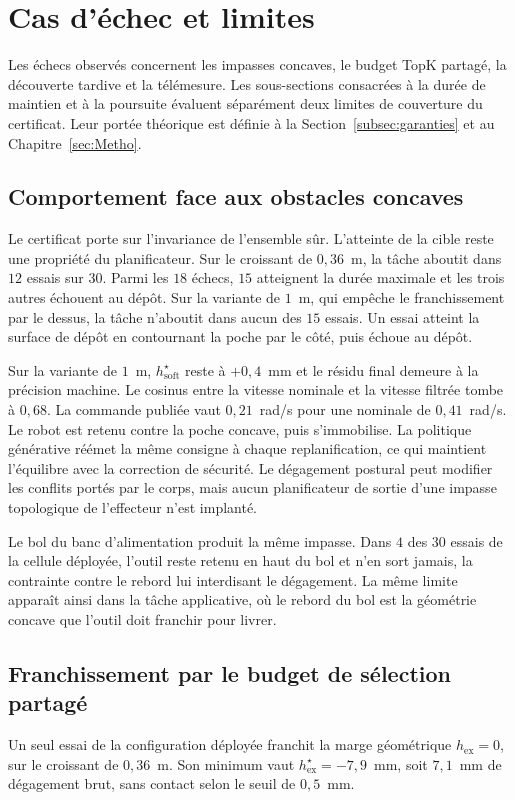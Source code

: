 \section{Cas d'échec et limites}\label{sec:res_echecs}
Les échecs observés concernent les impasses concaves, le budget TopK partagé, la découverte tardive et la télémesure. Les sous-sections consacrées à la durée de maintien et à la poursuite évaluent séparément deux limites de couverture du certificat. Leur portée théorique est définie à la Section~\ref{subsec:garanties} et au Chapitre~\ref{sec:Metho}.

\subsection*{Comportement face aux obstacles concaves}
Le certificat porte sur l'invariance de l'ensemble sûr. L'atteinte de la cible reste une propriété du planificateur. Sur le croissant de $0{,}36$~m, la tâche aboutit dans $12$ essais sur $30$. Parmi les $18$ échecs, $15$ atteignent la durée maximale et les trois autres échouent au dépôt. Sur la variante de $1$~m, qui empêche le franchissement par le dessus, la tâche n'aboutit dans aucun des $15$ essais. Un essai atteint la surface de dépôt en contournant la poche par le côté, puis échoue au dépôt.

Sur la variante de $1$~m, $h_{\mathrm{soft}}^{\star}$ reste à $+0{,}4$~mm et le résidu final demeure à la précision machine. Le cosinus entre la vitesse nominale et la vitesse filtrée tombe à $0{,}68$. La commande publiée vaut $0{,}21$~rad/s pour une nominale de $0{,}41$~rad/s. Le robot est retenu contre la poche concave, puis s'immobilise. La politique générative réémet la même consigne à chaque replanification, ce qui maintient l'équilibre avec la correction de sécurité. Le dégagement postural peut modifier les conflits portés par le corps, mais aucun planificateur de sortie d'une impasse topologique de l'effecteur n'est implanté.

Le bol du banc d'alimentation produit la même impasse. Dans $4$ des $30$ essais de la cellule déployée, l'outil reste retenu en haut du bol et n'en sort jamais, la contrainte contre le rebord lui interdisant le dégagement. La même limite apparaît ainsi dans la tâche applicative, où le rebord du bol est la géométrie concave que l'outil doit franchir pour livrer.

\subsection*{Franchissement par le budget de sélection partagé}
Un seul essai de la configuration déployée franchit la marge géométrique $h_{\mathrm{ex}}=0$, sur le croissant de $0{,}36$~m. Son minimum vaut $h_{\mathrm{ex}}^{\star}=-7{,}9$~mm, soit $7{,}1$~mm de dégagement brut, sans contact selon le seuil de $0{,}5$~mm.

